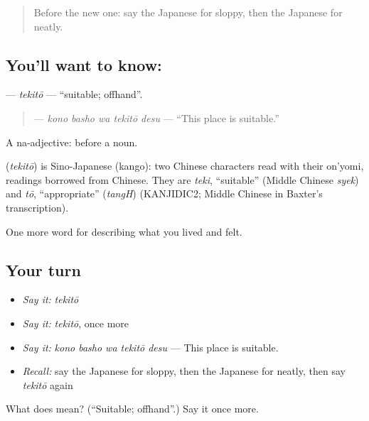 \label{lesson:JA-C440-tekitou}



\begin{quote}
Before the new one: say the Japanese for sloppy, then the Japanese for neatly.
\end{quote}

\subsection*{You'll want to know: }
\textbf{} — \emph{tekitō} — \textquotedblleft{}suitable; offhand\textquotedblright{}.

\begin{quote}
\textbf{  } — \emph{kono basho wa tekitō desu} — \textquotedblleft{}This place is suitable.\textquotedblright{}
\end{quote}

A na-adjective:  before a noun.

\begin{cousinweb}
\textbf{} (\emph{tekitō}) is Sino-Japanese (kango): two Chinese characters read with their on'yomi, readings borrowed from Chinese. They are \emph{teki}, \textquotedblleft{}suitable\textquotedblright{} (Middle Chinese \emph{syek}) and \emph{tō}, \textquotedblleft{}appropriate\textquotedblright{} (\emph{tangH}) (KANJIDIC2; Middle Chinese in Baxter's transcription).
\end{cousinweb}

\begin{grammarlens}[title={What you've built}]
One more word for describing what you lived and felt.
\end{grammarlens}

\subsection*{Your turn}
\begin{itemize}
\raggedright
  \item \emph{Say it:} \emph{tekitō}
  \item \emph{Say it:} \emph{tekitō}, once more
  \item \emph{Say it:} \emph{kono basho wa tekitō desu} — This place is suitable.
  \item \emph{Recall:} say the Japanese for sloppy, then the Japanese for neatly, then say \emph{tekitō} again
\end{itemize}

\begin{tcolorbox}[breakable,colback=teal!4,colframe=teal!35!black,title={Before you move on}]
What does  mean? (\textquotedblleft{}Suitable; offhand\textquotedblright{}.) Say it once more.
\end{tcolorbox}
